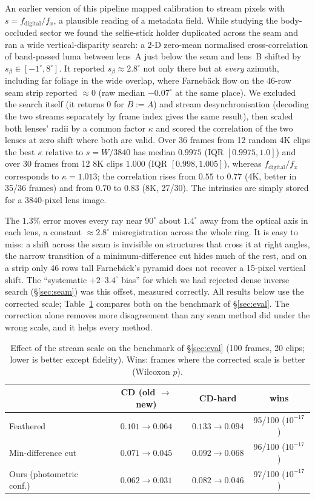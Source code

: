 \documentclass[11pt]{article}
\begin{document}
An earlier version of this pipeline mapped calibration to stream pixels with $s=f_{\mathrm{digital}}/f_x$, a plausible reading of a metadata field. While studying the body-occluded sector we found the selfie-stick holder duplicated across the seam and ran a wide vertical-disparity search: a 2-D zero-mean normalised cross-correlation of band-passed luma between lens~A just below the seam and lens~B shifted by $s_\beta\in[-1^\circ,8^\circ]$. It reported $s_\beta\approx2.8^\circ$ not only there but at \emph{every} azimuth, including far foliage in the wide overlap, where Farneb\"ack flow on the $46$-row seam strip reported $\approx0$ (raw median $-0.07^\circ$ at the same place). We excluded the search itself (it returns $0$ for $B{:=}A$) and stream desynchronisation (decoding the two streams separately by frame index gives the same result), then scaled both lenses' radii by a common factor $\kappa$ and scored the correlation of the two lenses at zero shift where both are valid. Over 36 frames from 12 random 4K clips the best $\kappa$ relative to $s=W/3840$ has median $0.9975$ (IQR $[0.9975, 1.0]$) and over 30 frames from 12 8K clips $1.000$ (IQR $[0.998, 1.005]$), whereas $f_{\mathrm{digital}}/f_x$ corresponds to $\kappa=1.013$; the correlation rises from $0.55$ to $0.77$ (4K, better in 35/36 frames) and from $0.70$ to $0.83$ (8K, 27/30). The intrinsics are simply stored for a $3840$-pixel lens image.

The $1.3\%$ error moves every ray near $90^\circ$ about $1.4^\circ$ away from the optical axis in each lens, a constant $\approx2.8^\circ$ misregistration across the whole ring. It is easy to miss: a shift across the seam is invisible on structures that cross it at right angles, the narrow transition of a minimum-difference cut hides much of the rest, and on a strip only 46 rows tall Farneb\"ack's pyramid does not recover a 15-pixel vertical shift. The ``systematic $+2$--$3.4^\circ$ bias'' for which we had rejected dense inverse search (\S\ref{sec:seam}) was this offset, measured correctly. All results below use the corrected scale; Table~\ref{tab:scale} compares both on the benchmark of \S\ref{sec:eval}. The correction alone removes more disagreement than any seam method did under the wrong scale, and it helps every method.

\begin{table}[t]
\centering
\caption{Effect of the stream scale on the benchmark of \S\ref{sec:eval} (100 frames, 20 clips; lower is better except fidelity). Wins: frames where the corrected scale is better (Wilcoxon $p$).}
\label{tab:scale}
\small
\begin{tabular}{lccc}
\toprule
 & CD (old $\to$ new) & CD-hard & wins \\
\midrule
Feathered          & $0.101\to0.064$ & $0.133\to0.094$ & 95/100 ($10^{-17}$) \\
Min-difference cut & $0.071\to0.045$ & $0.092\to0.068$ & 96/100 ($10^{-17}$) \\
Ours (photometric conf.) & $0.062\to0.031$ & $0.082\to0.046$ & 97/100 ($10^{-17}$) \\
\bottomrule
\end{tabular}
\end{table}
\end{document}
